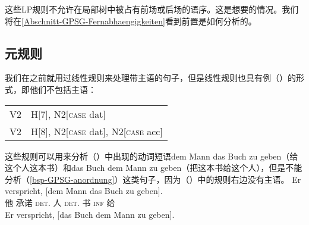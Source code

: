 这些LP规则不允许在局部树中被占有前场或后场的语序。这是想要的情况。我们将在\ref{Abschnitt-GPSG-Fernabhaengigkeiten}看到前置是如何分析的。

\subsection{元规则}
\label{sec-metarules-gpsg}

我们在之前就用过线性规则来处理带主语的句子，但是线性规则也具有例（）的形式，即他们不包括主语：
\ea
\label{gpsg-regel-dat-ditransitiv}
\begin{tabular}[t]{@{}l@{~$\to$~}l@{}}
V2  & H[7], N2[\textsc{case} dat]                \\
V2  & H[8], N2[\textsc{case} dat], N2[\textsc{case} acc]  \\
\end{tabular}
\z
这些规则可以用来分析（）中出现的动词短语dem Mann das Buch zu geben（给这个人这本书）和das Buch dem Mann zu geben（把这本书给这个人），但是不能分析（\ref{bsp-GPSG-anordnung}）这类句子，因为（）中的规则右边没有主语。
\eal
\ex 
\gll Er verspricht, [dem Mann das Buch zu geben].\\
     他 承诺    \spacebr{}\textsc{det}.\dat{} 人 \textsc{det}.\acc{} 书 \textsc{inf} 给\\
\ex 
\gll Er verspricht, [das Buch dem Mann zu geben].\\
